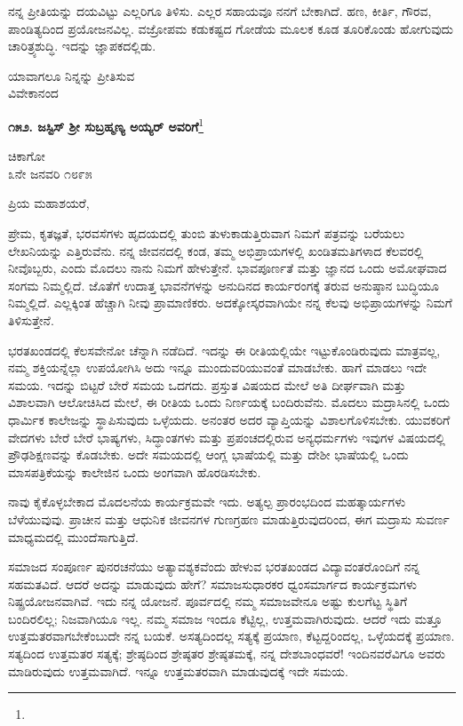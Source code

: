 ನನ್ನ ಪ್ರೀತಿಯನ್ನು ದಯವಿಟ್ಟು ಎಲ್ಲರಿಗೂ ತಿಳಿಸು. ಎಲ್ಲರ ಸಹಾಯವೂ ನನಗೆ ಬೇಕಾಗಿದೆ. ಹಣ, ಕೀರ್ತಿ, ಗೌರವ, ಪಾಂಡಿತ್ಯದಿಂದ ಪ್ರಯೋಜನವಿಲ್ಲ. ವಜ್ರೋಪಮ ಕಡುಕಷ್ಟದ ಗೋಡೆಯ ಮೂಲಕ ಕೂಡ ತೂರಿಕೊಂಡು ಹೋಗುವುದು ಚಾರಿತ್ರ್ಯಶುದ್ಧಿ. ಇದನ್ನು ಜ್ಞಾಪಕದಲ್ಲಿಡು.
\vspace{-0.2cm}

{\flushright
ಯಾವಾಗಲೂ ನಿನ್ನನ್ನು ಪ್ರೀತಿಸುವ\\ವಿವೇಕಾನಂದ\par}

\begin{center}
\textbf{೧೫೨. ಜಸ್ಟಿಸ್ ಶ‍್ರೀ ಸುಬ್ರಹ್ಮಣ್ಯ ಅಯ್ಯರ್ ಅವರಿಗೆ}\footnote{}
\end{center}
\vspace{-0.2cm}

\begin{flushright}
ಚಿಕಾಗೋ\\೩ನೇ ಜನವರಿ ೧೮೯೫
\end{flushright}

\noindent
ಪ್ರಿಯ ಮಹಾಶಯರೆ,

ಪ್ರೇಮ, ಕೃತಜ್ಞತೆ, ಭರವಸೆಗಳು ಹೃದಯದಲ್ಲಿ ತುಂಬಿ ತುಳುಕಾಡುತ್ತಿರುವಾಗ ನಿಮಗೆ ಪತ್ರವನ್ನು ಬರೆಯಲು ಲೇಖನಿಯನ್ನು ಎತ್ತಿರುವೆನು. ನನ್ನ ಜೀವನದಲ್ಲಿ ಕಂಡ, ತಮ್ಮ ಅಭಿಪ್ರಾಯಗಳಲ್ಲಿ ಖಂಡಿತಮತಿಗಳಾದ ಕೆಲವರಲ್ಲಿ ನೀವೊಬ್ಬರು, ಎಂದು ಮೊದಲು ನಾನು ನಿಮಗೆ ಹೇಳುತ್ತೇನೆ. ಭಾವಪೂರ್ಣತೆ ಮತ್ತು ಜ್ಞಾನದ ಒಂದು ಅಮೋಘವಾದ ಸಂಗಮ ನಿಮ್ಮಲ್ಲಿದೆ. ಜೊತೆಗೆ ಉದಾತ್ತ ಭಾವನೆಗಳನ್ನು ಅನುದಿನದ ಕಾರ್ಯರಂಗಕ್ಕೆ ತರುವ ಅನುಷ್ಠಾನ ಬುದ್ಧಿಯೂ ನಿಮ್ಮಲ್ಲಿದೆ. ಎಲ್ಲಕ್ಕಿಂತ ಹೆಚ್ಚಾಗಿ ನೀವು ಪ್ರಾಮಾಣಿಕರು. ಅದಕ್ಕೋಸ್ಕರವಾಗಿಯೇ ನನ್ನ ಕೆಲವು ಅಭಿಪ್ರಾಯಗಳನ್ನು ನಿಮಗೆ ತಿಳಿಸುತ್ತೇನೆ.

ಭರತಖಂಡದಲ್ಲಿ ಕೆಲಸವೇನೋ ಚೆನ್ನಾಗಿ ನಡೆದಿದೆ. ಇದನ್ನು ಈ ರೀತಿಯಲ್ಲಿಯೇ ಇಟ್ಟುಕೊಂಡಿರುವುದು ಮಾತ್ರವಲ್ಲ, ನಮ್ಮ ಶಕ್ತಿಯನ್ನೆಲ್ಲಾ ಉಪಯೋಗಿಸಿ ಅದು ಇನ್ನೂ ಮುಂದುವರಿಯುವಂತೆ ಮಾಡಬೇಕು. ಹಾಗೆ ಮಾಡಲು ಇದೇ ಸಮಯ. ಇದನ್ನು ಬಿಟ್ಟರೆ ಬೇರೆ ಸಮಯ ಒದಗದು. ಪ್ರಸ್ತುತ ವಿಷಯದ ಮೇಲೆ ಅತಿ ದೀರ್ಘವಾಗಿ ಮತ್ತು ವಿಶಾಲವಾಗಿ ಆಲೋಚಿಸಿದ ಮೇಲೆ, ಈ ರೀತಿಯ ಒಂದು ನಿರ್ಣಯಕ್ಕೆ ಬಂದಿರುವೆನು. ಮೊದಲು ಮದ್ರಾಸಿನಲ್ಲಿ ಒಂದು ಧಾರ್ಮಿಕ ಕಾಲೇಜನ್ನು ಸ್ಥಾಪಿಸುವುದು ಒಳ್ಳೆಯದು. ಅನಂತರ ಅದರ ವ್ಯಾಪ್ತಿಯನ್ನು ವಿಶಾಲಗೊಳಿಸಬೇಕು. ಯುವಕರಿಗೆ ವೇದಗಳು ಬೇರೆ ಬೇರೆ ಭಾಷ್ಯಗಳು, ಸಿದ್ಧಾಂತಗಳು ಮತ್ತು ಪ್ರಪಂಚದಲ್ಲಿರುವ ಅನ್ಯಧರ್ಮಗಳು\enginline{-} ಇವುಗಳ ವಿಷಯದಲ್ಲಿ ಪ್ರೌಢಶಿಕ್ಷಣವನ್ನು ಕೊಡಬೇಕು. ಅದೇ ಸಮಯದಲ್ಲಿ ಆಂಗ್ಲ ಭಾಷೆಯಲ್ಲಿ ಮತ್ತು ದೇಶೀ ಭಾಷೆಯಲ್ಲಿ ಒಂದು ಮಾಸಪತ್ರಿಕೆಯನ್ನು ಕಾಲೇಜಿನ ಒಂದು ಅಂಗವಾಗಿ ಹೊರಡಿಸಬೇಕು.

ನಾವು ಕೈಕೊಳ್ಳಬೇಕಾದ ಮೊದಲನೆಯ ಕಾರ್ಯಕ್ರಮವೇ ಇದು. ಅತ್ಯಲ್ಪ ಪ್ರಾರಂಭದಿಂದ ಮಹತ್ಕಾರ್ಯಗಳು ಬೆಳೆಯುವುವು. ಪ್ರಾಚೀನ ಮತ್ತು ಆಧುನಿಕ ಜೀವನಗಳ ಗುಣಗ್ರಹಣ ಮಾಡುತ್ತಿರುವುದರಿಂದ, ಈಗ ಮದ್ರಾಸು ಸುವರ್ಣ ಮಾಧ್ಯಮದಲ್ಲಿ ಮುಂದೆಸಾಗುತ್ತಿದೆ.

ಸಮಾಜದ ಸಂಪೂರ್ಣ ಪುನರಚನೆಯು ಅತ್ಯಾವಶ್ಯಕವೆಂದು ಹೇಳುವ ಭರತಖಂಡದ ವಿದ್ಯಾವಂತರೊಂದಿಗೆ ನನ್ನ ಸಹಮತವಿದೆ. ಆದರೆ ಅದನ್ನು ಮಾಡುವುದು ಹೇಗೆ? ಸಮಾಜಸುಧಾರಕರ ಧ್ವಂಸಮಾರ್ಗದ ಕಾರ್ಯಕ್ರಮಗಳು ನಿಷ್ಪ್ರಯೋಜನವಾಗಿವೆ. ಇದು ನನ್ನ ಯೋಜನೆ. ಪೂರ್ವದಲ್ಲಿ ನಮ್ಮ ಸಮಾಜವೇನೂ ಅಷ್ಟು ಕುಲಗೆಟ್ಟ ಸ್ಥಿತಿಗೆ ಬಂದಿರಲಿಲ್ಲ; ನಿಜವಾಗಿಯೂ ಇಲ್ಲ. ನಮ್ಮ ಸಮಾಜ ಇಂದೂ ಕೆಟ್ಟಿಲ್ಲ, ಉತ್ತಮವಾಗಿರುವುದು. ಆದರೆ ಇದು ಮತ್ತೂ ಉತ್ತಮತರವಾಗಬೇಕೆಂಬುದೇ ನನ್ನ ಬಯಕೆ. ಅಸತ್ಯದಿಂದಲ್ಲ ಸತ್ಯಕ್ಕೆ ಪ್ರಯಾಣ, ಕೆಟ್ಟದ್ದರಿಂದಲ್ಲ, ಒಳ್ಳೆಯದಕ್ಕೆ ಪ್ರಯಾಣ. ಸತ್ಯದಿಂದ ಉತ್ತಮತರ ಸತ್ಯಕ್ಕೆ; ಶ್ರೇಷ್ಠದಿಂದ ಶ್ರೇಷ್ಠತರ ಶ್ರೇಷ್ಠತಮಕ್ಕೆ, ನನ್ನ ದೇಶಬಾಂಧವರೆ! ಇಂದಿನವರೆವಿಗೂ ಅವರು ಮಾಡಿರುವುದು ಉತ್ತಮವಾಗಿದೆ. ಇನ್ನೂ ಉತ್ತಮತರವಾಗಿ ಮಾಡುವುದಕ್ಕೆ ಇದೇ ಸಮಯ.

